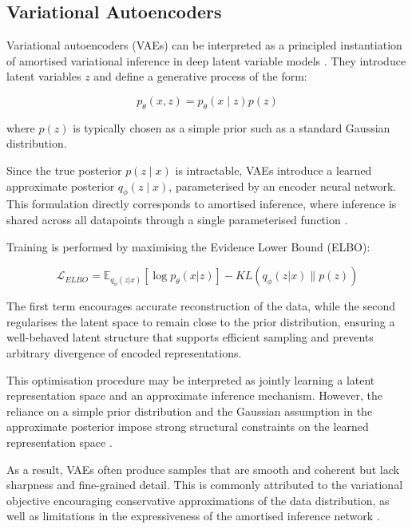 \documentclass[a4paper,twoside,12pt]{report}
\begin{document}
\subsection{Variational Autoencoders}

Variational autoencoders (VAEs) can be interpreted as a principled instantiation of amortised variational inference in deep latent variable models \citep{kingma2013auto, rezende2014stochastic, margossianblei2023amortized}. They introduce latent variables \(z\) and define a generative process of the form:

\begin{equation}
p_\theta(x, z) = p_\theta(x \mid z)p(z)
\end{equation}

where \(p(z)\) is typically chosen as a simple prior such as a standard Gaussian distribution.

Since the true posterior \(p(z \mid x)\) is intractable, VAEs introduce a learned approximate posterior \(q_\phi(z \mid x)\), parameterised by an encoder neural network. This formulation directly corresponds to amortised inference, where inference is shared across all datapoints through a single parameterised function \citep{margossianblei2023amortized}.

Training is performed by maximising the Evidence Lower Bound (ELBO):

\begin{equation}
\mathcal{L}_{ELBO} = \mathbb{E}_{q_\phi(z|x)}[\log p_\theta(x|z)] - KL(q_\phi(z|x)\|p(z))
\end{equation}

The first term encourages accurate reconstruction of the data, while the second regularises the latent space to remain close to the prior distribution, ensuring a well-behaved latent structure that supports efficient sampling and prevents arbitrary divergence of encoded representations.

This optimisation procedure may be interpreted as jointly learning a latent representation space and an approximate inference mechanism. However, the reliance on a simple prior distribution and the Gaussian assumption in the approximate posterior impose strong structural constraints on the learned representation space \citep{kingma2013auto}.

As a result, VAEs often produce samples that are smooth and coherent but lack sharpness and fine-grained detail. This is commonly attributed to the variational objective encouraging conservative approximations of the data distribution, as well as limitations in the expressiveness of the amortised inference network \citep{bowman2016generating, kingma2019introduction}.
\end{document}
